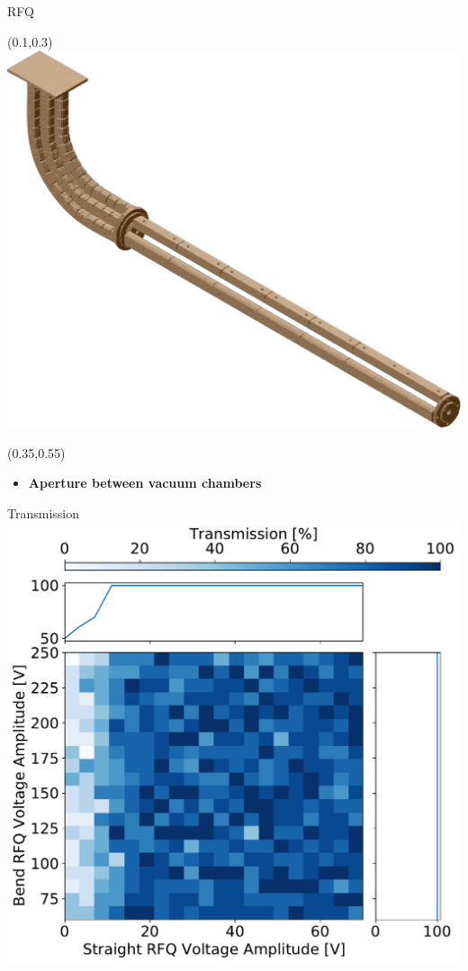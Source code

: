 \documentclass{beamer}
\begin{document}
\begin{frame}{RFQ}
    \begin{textblock*}{0.5\textwidth}(0.1\textwidth,0.3\textheight)
    \centering
    \includegraphics[scale=0.25]{RFQ.pdf}
    \end{textblock*}
    \begin{textblock*}{0.7\textwidth}(0.35\textwidth,0.55\textheight)
        \begin{itemize}
            \item \textbf{Aperture between vacuum chambers}
        \end{itemize}
    \end{textblock*}
\end{frame}
\begin{frame}{Transmission}
    \vspace*{2em}
    \centering
    \includegraphics[scale=0.4]{gas_2cham.pdf}
\end{frame}
\end{document}
